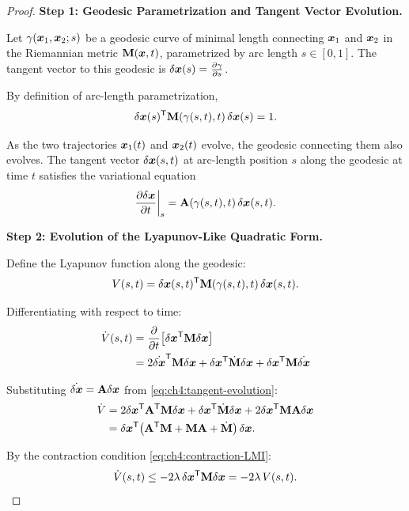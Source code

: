 \begin{proof}
\textbf{Step 1: Geodesic Parametrization and Tangent Vector Evolution.}

Let $\gamma(\bm{x}_1, \bm{x}_2; s)$ be a geodesic curve of minimal length connecting $\bm{x}_1$ and
$\bm{x}_2$ in the Riemannian metric $\mathbf{M}(\bm{x},t)$, parametrized by arc length $s \in [0,1]$.
The tangent vector to this geodesic is $\delta\bm{x}(s) = \frac{\partial\gamma}{\partial s}$.

By definition of arc-length parametrization,
\begin{equation}
\delta\bm{x}(s)^{\mathsf{T}} \mathbf{M}(\gamma(s,t), t) \, \delta\bm{x}(s) = 1.
\label{eq:ch4:unit-tangent}
\end{equation}

As the two trajectories $\bm{x}_1(t)$ and $\bm{x}_2(t)$ evolve, the geodesic connecting them also
evolves. The tangent vector $\delta\bm{x}(s,t)$ at arc-length position $s$ along the geodesic at
time $t$ satisfies the variational equation
\begin{equation}
\frac{\partial \delta\bm{x}}{\partial t}\bigg|_{s} = \mathbf{A}(\gamma(s,t),t) \, \delta\bm{x}(s,t).
\label{eq:ch4:tangent-evolution}
\end{equation}

\textbf{Step 2: Evolution of the Lyapunov-Like Quadratic Form.}

Define the Lyapunov function along the geodesic:
\begin{equation}
V(s,t) = \delta\bm{x}(s,t)^{\mathsf{T}} \mathbf{M}(\gamma(s,t),t) \, \delta\bm{x}(s,t).
\label{eq:ch4:geodesic-V}
\end{equation}

Differentiating with respect to time:
\begin{align}
\dot{V}(s,t) &= \frac{\partial}{\partial t}\!\left[\delta\bm{x}^{\mathsf{T}} \mathbf{M} \delta\bm{x}\right] \\
&= 2\dot{\delta\bm{x}}^{\mathsf{T}} \mathbf{M} \delta\bm{x} + \delta\bm{x}^{\mathsf{T}} \dot{\mathbf{M}} \delta\bm{x} + \delta\bm{x}^{\mathsf{T}} \mathbf{M} \dot{\delta\bm{x}}
\end{align}

Substituting $\dot{\delta\bm{x}} = \mathbf{A}\delta\bm{x}$ from \eqref{eq:ch4:tangent-evolution}:
\begin{align}
\dot{V} &= 2\delta\bm{x}^{\mathsf{T}} \mathbf{A}^{\mathsf{T}} \mathbf{M} \delta\bm{x} + \delta\bm{x}^{\mathsf{T}} \dot{\mathbf{M}} \delta\bm{x} + 2\delta\bm{x}^{\mathsf{T}} \mathbf{M} \mathbf{A} \delta\bm{x} \\
&= \delta\bm{x}^{\mathsf{T}} \!\left(\mathbf{A}^{\mathsf{T}}\mathbf{M} + \mathbf{M}\mathbf{A} + \dot{\mathbf{M}}\right) \delta\bm{x}.
\end{align}

By the contraction condition \eqref{eq:ch4:contraction-LMI}:
\begin{equation}
\dot{V}(s,t) \leq -2\lambda \, \delta\bm{x}^{\mathsf{T}} \mathbf{M} \delta\bm{x} = -2\lambda \, V(s,t).
\label{eq:ch4:Vdot-bound}
\end{equation}


\end{proof}
